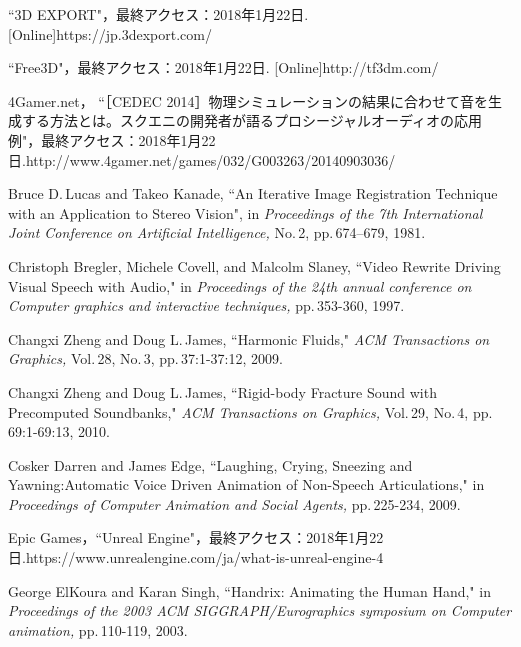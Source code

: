 \renewcommand{\refname}{参考文献}	
%
\begin{thebibliography}{55}
%
``3D EXPORT"，最終アクセス：2018年1月22日.
[Online]https://jp.3dexport.com/

``Free3D"，最終アクセス：2018年1月22日.
[Online]http://tf3dm.com/

4Gamer.net，
``［CEDEC 2014］物理シミュレーションの結果に合わせて音を生成する方法とは。スクエニの開発者が語るプロシージャルオーディオの応用例"，最終アクセス：2018年1月22日.\newline
[Online]http://www.4gamer.net/games/032/G003263/20140903036/

Bruce D.\,Lucas and Takeo Kanade,
 ``An Iterative Image Registration Technique with an Application to Stereo Vision",
 in \textit{Proceedings of the 7th International Joint Conference on Artificial Intelligence,} No.\,2, pp.\,674--679, 1981.

%
Christoph Bregler, Michele Covell, and Malcolm Slaney,
 ``Video Rewrite Driving Visual Speech with Audio,"
 in \textit{Proceedings of the 24th annual conference on Computer graphics and interactive techniques,} pp.\,353-360, 1997.

Changxi Zheng and Doug L.\,James,
``Harmonic Fluids,"
\textit{ACM Transactions on Graphics,} Vol.\,28, No.\,3, pp.\,37:1-37:12, 2009.

Changxi Zheng and Doug L.\,James,
``Rigid-body Fracture Sound with Precomputed Soundbanks,"
\textit{ACM Transactions on Graphics,} Vol.\,29, No.\,4, pp.\,69:1-69:13, 2010.

Cosker Darren and James Edge,
 ``Laughing, Crying, Sneezing and Yawning:Automatic Voice Driven Animation of Non-Speech Articulations,"
 in \textit{Proceedings of Computer Animation and Social Agents,} pp.\,225-234, 2009.

Epic Games，``Unreal Engine"，最終アクセス：2018年1月22日.\newline
[Online]https://www.unrealengine.com/ja/what-is-unreal-engine-4

George ElKoura and Karan Singh,
 ``Handrix: Animating the Human Hand,"
  in \textit{Proceedings of the 2003 ACM SIGGRAPH/Eurographics symposium on Computer animation,}
  pp.\,110-119, 2003.


\end{thebibliography}
